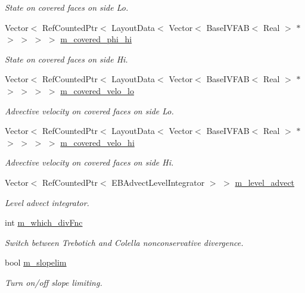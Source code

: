 \begin{DoxyCompactItemize}
\begin{DoxyCompactList}\small\item\em State on covered faces on side Lo. \end{DoxyCompactList}\item 
Vector$<$ Ref\+Counted\+Ptr$<$ Layout\+Data$<$ Vector$<$ Base\+I\+V\+F\+AB$<$ Real $>$ $\ast$ $>$ $>$ $>$ $>$ \hyperlink{classcdr__gdnv_ad353062c90baecdb6f33dbbff3828c5b}{m\+\_\+covered\+\_\+phi\+\_\+hi}
\begin{DoxyCompactList}\small\item\em State on covered faces on side Hi. \end{DoxyCompactList}\item 
Vector$<$ Ref\+Counted\+Ptr$<$ Layout\+Data$<$ Vector$<$ Base\+I\+V\+F\+AB$<$ Real $>$ $\ast$ $>$ $>$ $>$ $>$ \hyperlink{classcdr__gdnv_a5c2a6fbb4832b38430c82e0903d728b9}{m\+\_\+covered\+\_\+velo\+\_\+lo}
\begin{DoxyCompactList}\small\item\em Advective velocity on covered faces on side Lo. \end{DoxyCompactList}\item 
Vector$<$ Ref\+Counted\+Ptr$<$ Layout\+Data$<$ Vector$<$ Base\+I\+V\+F\+AB$<$ Real $>$ $\ast$ $>$ $>$ $>$ $>$ \hyperlink{classcdr__gdnv_a0bd70710cada49c3dd5ab1b65e427dcf}{m\+\_\+covered\+\_\+velo\+\_\+hi}
\begin{DoxyCompactList}\small\item\em Advective velocity on covered faces on side Hi. \end{DoxyCompactList}\item 
Vector$<$ Ref\+Counted\+Ptr$<$ E\+B\+Advect\+Level\+Integrator $>$ $>$ \hyperlink{classcdr__gdnv_a1f94232e428c9b4e234cdf3e5cfb0736}{m\+\_\+level\+\_\+advect}
\begin{DoxyCompactList}\small\item\em Level advect integrator. \end{DoxyCompactList}\item 
int \hyperlink{classcdr__gdnv_ac3d6217f969a9c3484c897b7e6432ea1}{m\+\_\+which\+\_\+div\+Fnc}
\begin{DoxyCompactList}\small\item\em Switch between Trebotich and Colella nonconservative divergence. \end{DoxyCompactList}\item 
bool \hyperlink{classcdr__gdnv_a9ec20ef995ece4e2b4c7bd8c84fb27f1}{m\+\_\+slopelim}
\begin{DoxyCompactList}\small\item\em Turn on/off slope limiting. \end{DoxyCompactList}\end{DoxyCompactItemize}


